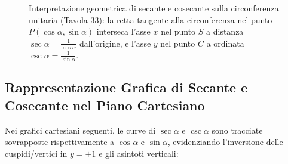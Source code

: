 \documentclass[11pt,a4paper,oneside]{report}
\begin{document}
\begin{figure}[htbp]
\caption{Interpretazione geometrica di secante e cosecante sulla circonferenza unitaria (Tavola 33): la retta tangente alla circonferenza nel punto $P(\cos\alpha, \sin\alpha)$ interseca l'asse $x$ nel punto $S$ a distanza $\sec\alpha = \frac{1}{\cos\alpha}$ dall'origine, e l'asse $y$ nel punto $C$ a ordinata $\csc\alpha = \frac{1}{\sin\alpha}$.}
\label{fig:circonferenza_secante_cosecante}
\end{figure}

\subsection*{Rappresentazione Grafica di Secante e Cosecante nel Piano Cartesiano}
Nei grafici cartesiani seguenti, le curve di $\sec\alpha$ e $\csc\alpha$ sono tracciate sovrapposte rispettivamente a $\cos\alpha$ e $\sin\alpha$, evidenziando l'inversione delle cuspidi/vertici in $y = \pm 1$ e gli asintoti verticali:
\end{document}
